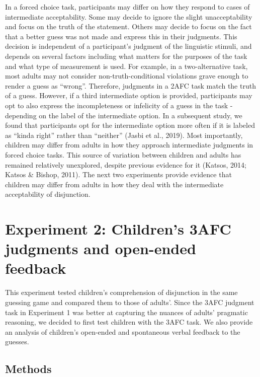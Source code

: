 \documentclass[,man,floatsintext]{apa6}
\begin{document}
In a forced choice task, participants may differ on how they respond to cases of intermediate acceptability. Some may decide to ignore the slight unacceptability and focus on the truth of the statement. Others may decide to focus on the fact that a better guess was not made and express this in their judgments. This decision is independent of a participant's judgment of the linguistic stimuli, and depends on several factors including what matters for the purposes of the task and what type of measurement is used. For example, in a two-alternative task, most adults may not consider non-truth-conditional violations grave enough to render a guess as \enquote{wrong}. Therefore, judgments in a 2AFC task match the truth of a guess. However, if a third intermediate option is provided, participants may opt to also express the incompleteness or infelicity of a guess in the task - depending on the label of the intermediate option. In a subsequent study, we found that participants opt for the intermediate option more often if it is labeled as \enquote{kinda right} rather than \enquote{neither} (Jasbi et al., 2019). Most importantly, children may differ from adults in how they approach intermediate judgments in forced choice tasks. This source of variation between children and adults has remained relatively unexplored, despite previous evidence for it (Katsos, 2014; Katsos \& Bishop, 2011). The next two experiments provide evidence that children may differ from adults in how they deal with the intermediate acceptability of disjunction.

\hypertarget{study2}{%
\section{Experiment 2: Children's 3AFC judgments and open-ended feedback}\label{study2}}

This experiment tested children's comprehension of disjunction in the same guessing game and compared them to those of adults'. Since the 3AFC judgment task in Experiment 1 was better at capturing the nuances of adults' pragmatic reasoning, we decided to first test children with the 3AFC task. We also provide an analysis of children's open-ended and spontaneous verbal feedback to the guesses.

\hypertarget{methods-1}{%
\subsection{Methods}\label{methods-1}}
\end{document}
